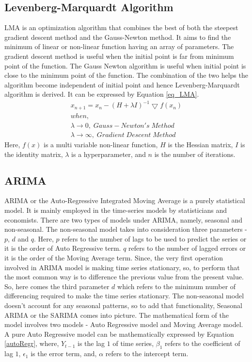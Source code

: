 \documentclass[times,twocolumn,final,authoryear]{elsarticle}
\begin{document}
	\subsection{Levenberg-Marquardt Algorithm}
	LMA is an optimization algorithm that combines the best of both the steepest gradient descent method and the Gauss-Newton method. It aims to find the minimum of linear or non-linear function having an array of parameters. The gradient descent method is useful when the initial point is far from minimum point of the function. The Gauss Newton algorithm is useful when initial point is close to the minimum point of the function. The combination of the two helps the algorithm become independent of initial point and hence Levenberg-Marquardt algorithm is derived. It can be expressed by Equation \ref{eq_LMA}.
	\begin{equation}
		\label{eq_LMA}
		\begin{array}{l}
			x_{n+1} = x_n - (H + \lambda I)^{-1} \bigtriangledown f(x_n) \\
			when,\\
			\lambda \rightarrow 0, \; Gauss-Newton's \; Method \\
			\lambda \rightarrow \infty, \;  Gradient \; Descent \; Method
		\end{array}
	\end{equation}
	Here, \(f(x)\) is a multi variable non-linear function, \(H\) is the Hessian matrix, \(I\) is the identity matrix, \(\lambda\) is a hyperparameter, and \(n\) is the number of iterations.\\
	
	\subsection{ARIMA}
	ARIMA or the Auto-Regressive Integrated Moving Average is a purely statistical model. It is mainly employed in the time-series models by statisticians and economists. There are two types of models under ARIMA, namely, seasonal and non-seasonal. The non-seasonal model takes into consideration three parameters - \(p\), \(d\) and \(q\). Here, \(p\) refers to the number of lags to be used to predict the series or it is the order of Auto Regressive term. \(q\) refers to the number of lagged errors or it is the order of the Moving Average term. Since, the very first operation involved in ARIMA model is making time series stationary, so, to perform that the most common way is to difference the previous value from the present value. So, here comes the third parameter \(d\) which refers to the minimum number of differencing required to make the time series stationary. The non-seasonal model doesn't account for any seasonal patterns, so to add that functionality, Seasonal ARIMA or the SARIMA \cite{SARIMA} comes into picture. The mathematical form of the model involves two models - Auto Regressive model and Moving Average model. A pure Auto Regressive model can be mathematically expressed by Equation \ref{autoRegr}, 	where, \(Y_{t-1}\) is the lag \(1\) of time series, \(\beta_1\) refers to the coefficient of lag \(1\), \(\epsilon_1\) is the error term, and, \(\alpha\) refers to the intercept term.
	
\end{document}
